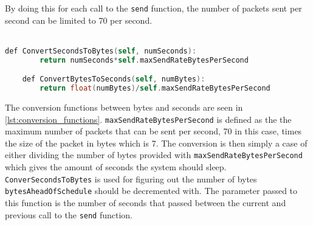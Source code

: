 By doing this for each call to the \texttt{send} function, the number of packets sent per second can be limited to 70 per second.
\\\\
\begin{lstlisting}[caption={function for converting seconds to bytes and bytes to seconds}, captionpos=b,language=C,label={lst:conversion_functions}]
    def ConvertSecondsToBytes(self, numSeconds):
        return numSeconds*self.maxSendRateBytesPerSecond

    def ConvertBytesToSeconds(self, numBytes):
        return float(numBytes)/self.maxSendRateBytesPerSecond
\end{lstlisting}
\noindent
The conversion functions between bytes and seconds are seen in \autoref{lst:conversion_functions}.
\texttt{maxSendRateBytesPerSecond} is defined as the the maximum number of packets that can be sent per second, 70 in this case, times the size of the packet in bytes which is 7.
The conversion is then simply a case of either dividing the number of bytes provided with \texttt{maxSendRateBytesPerSecond} which gives the amount of seconds the system should sleep.
\texttt{ConverSecondsToBytes} is used for figuring out the number of bytes \texttt{bytesAheadOfSchedule} should be decremented with.
The parameter passed to this function is the number of seconds that passed between the current and previous call to the \texttt{send} function.
